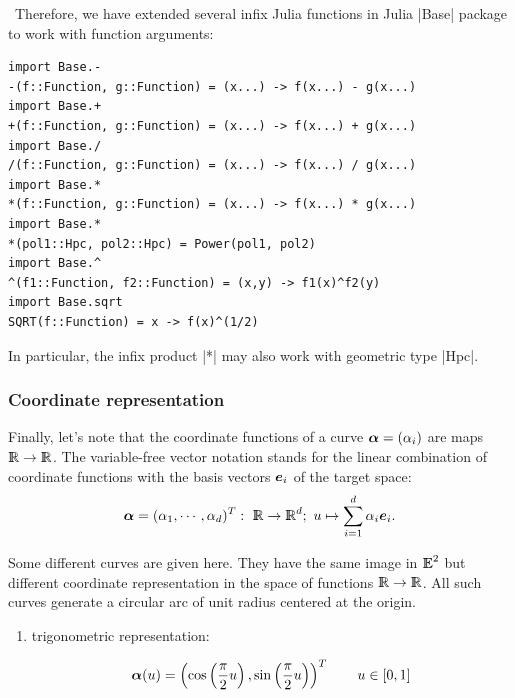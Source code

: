 \begin{coding}[Algebraic computation of FE = $\delta_1$]
{\begin{coding}\ 
Therefore, we have extended several infix Julia functions in Julia |Base| package to work with function arguments:
\begin{lstlisting}[language=JuliaLocal, style=julia, mathescape=true]
import Base.-
-(f::Function, g::Function) = (x...) -> f(x...) - g(x...)  
import Base.+  
+(f::Function, g::Function) = (x...) -> f(x...) + g(x...)  
import Base./  
/(f::Function, g::Function) = (x...) -> f(x...) / g(x...)  
import Base.*  
*(f::Function, g::Function) = (x...) -> f(x...) * g(x...)  
import Base.*
*(pol1::Hpc, pol2::Hpc) = Power(pol1, pol2)
import Base.^
^(f1::Function, f2::Function) = (x,y) -> f1(x)^f2(y) 
import Base.sqrt
SQRT(f::Function) = x -> f(x)^(1/2) 
\end{lstlisting}
In particular, the infix product |*| may also work with geometric type |Hpc|.
\end{coding}




\subsubsection*{Coordinate representation}

Finally, let’s note that the coordinate functions of a curve ${\mbox{\boldmath $\alpha$}}
= (\alpha_{i})$ are maps $\mathbb{I\!\!R}\rightarrow\mathbb{I\!\!R}$.  The variable-free
vector notation stands for the linear combination of coordinate
functions with the basis vectors ${\mbox{\boldmath $e$}}_{i}$ of the target space:
\[
{\mbox{\boldmath $\alpha$}} = ({\alpha}_{1}, \cdots, {\alpha}_{d})^{T}:\
\mathbb{I\!\!R}\rightarrow\mathbb{I\!\!R}^{d} ;\ u \mapsto
\sum_{i=1}^{d} {\alpha}_{i} {\mbox{\boldmath $e$}}_{i}.
\]


%
%
%
%
%
\begin{condition}
\label{ex:5:4:circumference}
Some different curves are given here.  They have the same image in $
\mathbb{I\!\!E}^{2}$ but different coordinate representation in the space of
functions $\mathbb{I\!\!R}\rightarrow\mathbb{I\!\!R}$.  All such curves generate a circular arc
of unit radius centered at the origin.
\begin{enumerate}
  
\item  trigonometric representation:

\[
{\mbox{\boldmath $\alpha$}}(u) = \left(\cos \left({\pi \over 2}u\right), \sin \left({\pi \over
2}u\right)\right)^T \qquad u\in[0,1]
\]


\end{enumerate}
\end{condition}}
\end{coding}
